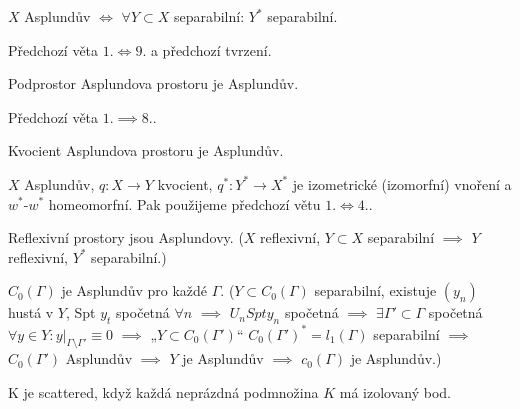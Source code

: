 \documentclass[12pt]{article}					%
\begin{document}
\begin{dusledek}
	$X$ Asplundův $\Leftrightarrow$ $\forall Y \subset X$ separabilní: $Y^*$ separabilní.

	\begin{dukazin}
		Předchozí věta $1. \Leftrightarrow 9.$ a předchozí tvrzení.
	\end{dukazin}
\end{dusledek}

\begin{dusledek}
	Podprostor Asplundova prostoru je Asplundův.

	\begin{dukazin}
		Předchozí věta $1. \implies 8.$.
	\end{dukazin}

	Kvocient Asplundova prostoru je Asplundův.

	\begin{dukazin}
		$X$ Asplundův, $q: X \rightarrow Y$ kvocient, $q^*: Y^* \rightarrow X^*$ je izometrické (izomorfní) vnoření a $w^*$-$w^*$ homeomorfní. Pak použijeme předchozí větu $1. \Leftrightarrow 4.$.
	\end{dukazin}
\end{dusledek}

\begin{priklady}
	Reflexivní prostory jsou Asplundovy. ($X$ reflexivní, $Y \subset X$ separabilní $\implies$ $Y$ reflexivní, $Y^*$ separabilní.)

	$C_0(Γ)$ je Asplundův pro každé $Γ$. ($Y \subset C_0(Γ)$ separabilní, existuje $(y_n)$ hustá v $Y$, Spt $y_t$ spočetná $\forall n$ $\implies$ $U_n Spt y_n$ spočetná $\implies$ $\exists Γ' \subset Γ$ spočetná $\forall y \in Y: y|_{Γ \setminus Γ'} ≡ 0$ $\implies$ „$Y \subset C_0(Γ')$“ $C_0(Γ')^* = l_1(Γ)$ separabilní $\implies$ $C_0(Γ')$ Asplundův $\implies$ $Y$ je Asplundův $\implies$ $c_0(Γ)$ je Asplundův.)
\end{priklady}

\begin{definice}
	K je scattered, když každá neprázdná podmnožina $K$ má izolovaný bod.
\end{definice}
\end{document}
